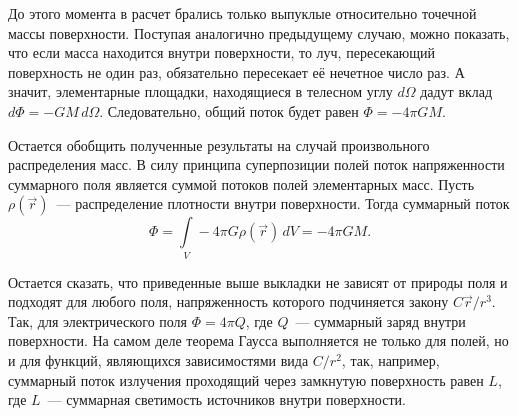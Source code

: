 До этого момента в расчет брались только выпуклые относительно точечной массы поверхности. Поступая аналогично предыдущему случаю, можно показать, что если масса находится внутри поверхности, то луч, пересекающий поверхность не один раз, обязательно пересекает её нечетное число раз. А значит, элементарные площадки, находящиеся в телесном углу $d\Omega$ дадут вклад $d\Phi = - GM \,d \Omega$. Следовательно, общий поток будет равен $\Phi = - 4 \pi GM$.

Остается обобщить полученные результаты на случай произвольного распределения масс. В силу принципа суперпозиции полей поток напряженности суммарного поля является суммой потоков полей элементарных масс. Пусть $\rho(\vec r)$~--- распределение плотности внутри поверхности. Тогда суммарный поток
\begin{equation*}
    \Phi = \int\limits_V -4\pi G \rho(\vec r) \,d V = -4 \pi GM.
\end{equation*}

Остается сказать, что приведенные выше выкладки не зависят от природы поля и подходят для любого поля, напряженность которого подчиняется закону $C\vec{r}/r^3$. Так, для электрического поля $\Phi = 4\pi Q$, где $Q$~--- суммарный заряд внутри поверхности. На самом деле теорема Гаусса выполняется не только для полей, но и для функций, являющихся зависимостями вида $C/r^2$, так, например, суммарный поток излучения проходящий через замкнутую поверхность равен $L$, где $L$~--- суммарная светимость источников внутри поверхности.
